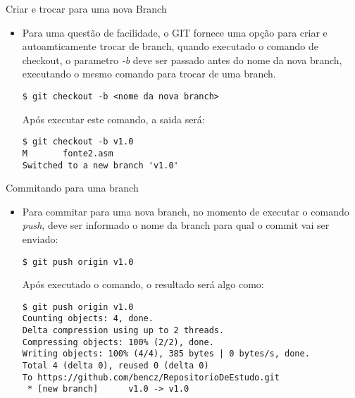 \begin{slide}[method=direct]{Criar e trocar para uma nova Branch}
	\begin{itemize}
	\item{Para uma questão de facilidade, o GIT fornece uma opção para criar e autoamticamente trocar de branch, quando executado o comando de checkout, o parametro \textit{-b} deve ser passado antes do nome da nova branch, executando o mesmo comando para trocar de uma branch.
	\begin{lstlisting}[style=Bash]
$ git checkout -b <nome da nova branch>
	\end{lstlisting}
	Após executar este comando, a saida será:
	\begin{lstlisting}[style=Bash]
$ git checkout -b v1.0
M       fonte2.asm
Switched to a new branch 'v1.0'
	\end{lstlisting}
	}
	\end{itemize}
\end{slide}

\begin{slide}[method=direct]{Commitando para uma branch}
	\begin{itemize}
	\item{Para commitar para uma nova branch, no momento de executar o comando \textit{push}, deve ser informado o nome da branch para qual o commit vai ser enviado:
	\begin{lstlisting}[style=Bash]
$ git push origin v1.0
	\end{lstlisting}
	Após executado o comando, o resultado será algo como:
	\begin{lstlisting}[style=Bash,basicstyle=\tiny]
$ git push origin v1.0
Counting objects: 4, done.
Delta compression using up to 2 threads.
Compressing objects: 100% (2/2), done.
Writing objects: 100% (4/4), 385 bytes | 0 bytes/s, done.
Total 4 (delta 0), reused 0 (delta 0)
To https://github.com/bencz/RepositorioDeEstudo.git
 * [new branch]      v1.0 -> v1.0
 	\end{lstlisting}
	}
	\end{itemize}
\end{slide}

